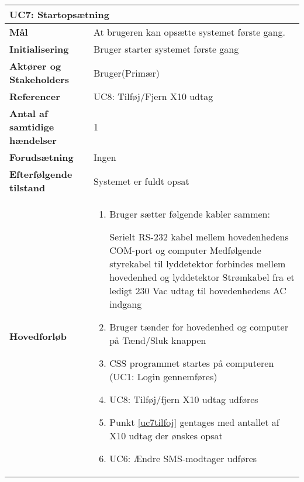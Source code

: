 \begin{table}[H] \centering
	\begin{tabular}{|p{6cm}|p{8cm}|}
	\hline
		\multicolumn{2}{|l|}{\textbf{UC7: Startopsætning}} \\\hline
		
		\textbf{Mål}							&At brugeren kan opsætte systemet første gang.					\\\hline
		\textbf{Initialisering}				&Bruger	starter systemet første gang				 										\\\hline
		\textbf{Aktører og Stakeholders}		&Bruger(Primær)			\\\hline
		\textbf{Referencer}					&UC8: Tilføj/Fjern X10 udtag										\\\hline
		\textbf{Antal af samtidige hændelser}&1 																\\\hline
		\textbf{Forudsætning}				&Ingen															\\\hline
		\textbf{Efterfølgende tilstand}		&Systemet er fuldt opsat											\\\hline
		\textbf{Hovedforløb}					
			&\begin{enumerate}
	
				\item Bruger sætter følgende kabler sammen:
				
					\subitem Serielt RS-232 kabel mellem hovedenhedens COM-port og computer
					\subitem Medfølgende styrekabel til lyddetektor forbindes mellem hovedenhed og lyddetektor
					\subitem Strømkabel fra et ledigt 230 Vac udtag til hovedenhedens AC indgang
				
				\item Bruger tænder for hovedenhed og computer på Tænd/Sluk knappen
				
				\item CSS programmet startes på computeren (UC1: Login gennemføres)
				
				\item \label{uc7tilfoj} UC8: Tilføj/fjern X10 udtag udføres
				
				\item Punkt \ref{uc7tilfoj} gentages med antallet af X10 udtag der ønskes opsat
				
				\item \label{uc7sms} UC6: Ændre SMS-modtager udføres
																													
			\end{enumerate}\\\hline
											
	\end{tabular}
	\label{UC7} 
\end{table}